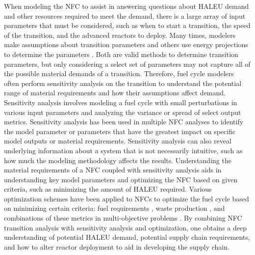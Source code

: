When modeling the \gls{NFC} to assist in answering questions about 
\gls{HALEU} demand and other resources required to meet the demand, 
there is a large array of input parameters that must be considered, 
such as when to start a transition, the speed of the 
transition, and the advanced reactors to deploy. Many times, modelers make 
assumptions about transition parameters 
\cite{sunny_transition_2015, djokic_application_2015}
and others use energy projections to determine the parameters 
\cite{dixon_estimated_2022}. Both are valid methods to determine 
transition parameters, but only considering a select set of parameters may 
not capture all of the possible material demands of a transition. 
Therefore, fuel cycle modelers often perform sensitivity analysis on 
the transition to understand the potential range of material 
requirements and how their assumptions affect demand. 
Sensitivity analysis involves 
modeling a fuel cycle with small perturbations in various input 
parameters and analyzing the variance or spread of select output metrics. 
Sensitivity analysis has been used in multiple \gls{NFC} analyses 
\cite{chee_sensitivity_2019,feng_sensitivity_2020,thiolliere_methodology_2018,passerini_sensitivity_2012}
to identify the model parameter or parameters that have the greatest 
impact on specific model outputs or material requirements. Sensitivity 
analysis can also reveal underlying information about a system that is not 
necessarily intuitive, such as how much the modeling methodology 
affects the results. Understanding the 
material requirements of a \gls{NFC} coupled with sensitivity analysis 
aids in understanding key model parameters and optimizing the 
\gls{NFC} based on given criteria, such as 
minimizing the amount of \gls{HALEU} required. Various 
optimization schemes have been applied to \glspl{NFC} to optimize the fuel 
cycle based on minimizing certain criteria: fuel requirements \cite{kim_selection_1999},
waste production \cite{shwageraus_optimization_2003}, and combinations 
of these metrics in multi-objective 
problems \cite{passerini_systematic_2014}. By combining \gls{NFC} transition 
analysis with sensitivity analysis and optimization, one obtains
a deep understanding of potential \gls{HALEU} demand, potential supply 
chain requirements, and how to alter reactor deployment to aid in developing 
the supply chain. 

